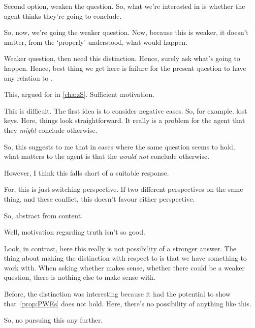 \begin{note}
  Second option, weaken the question.
  So, what we're interested in is whether the agent thinks they're going to conclude.

  So, now, we're going the weaker question.
  Now, because this is weaker, it doesn't matter, from the \agpe{} `properly' understood, what would happen.

  Weaker question, then need this distinction.
  Hence, surely ask what's going to happen.
  Hence, best thing we get here is failure for the present question to have any relation to \qWhy{}.

  This, argued for in \autoref{cha:zS}.
  Sufficient motivation.
\end{note}

\begin{note}
  This is difficult.
  The first idea is to consider negative cases.
  So, for example, lost keys.
  Here, things look straightforward.
  It really is a problem for the agent that they \emph{might} conclude otherwise.

  So, this suggests to me that in cases where the same question seems to hold, what matters to the agent is that the \emph{would not} conclude otherwise.

  However, I think this falls short of a suitable response.

  For, this is just switching perspective.
  If two different perspectives on the same thing, and these conflict, this doesn't favour either perspective.
\end{note}

\begin{note}
  So, abstract from content.
\end{note}

\begin{note}
  Well, motivation regarding truth isn't so good.
\end{note}

\begin{note}
  Look, in contrast, here this really is not possibility of a stronger answer.
  The thing about making the distinction with respect to \qzS{} is that we have something to work with.
  When asking whether \qzS{} makes sense, whether there could be a weaker question, there is nothing else to make sense with.

  Before, the distinction was interesting because it had the potential to show that~\autoref{prop:PWEs} does not hold.
  Here, there's no possibility of anything like this.
\end{note}

\begin{note}
  So, no pursuing this any further.
\end{note}

